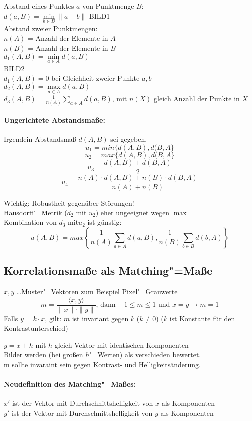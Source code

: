 \documentclass[a4paper,12pt]{scrreprt}
\begin{document}
Abstand eines Punktes $a$ von Punktmenge $B$:\\ $d(a,B)=\min\limits_{b\in B}
\|a-b\|$
BILD1\\
Abstand zweier Punktmengen:\\
$n(A)$ = Anzahl der Elemente in $A$\\
$n(B)$ = Anzahl der Elemente in $B$\\
$d_1(A,B)=\min\limits_{a\in A} d(a,B)$\\
BILD2\\
$d_1(A,B)=0$ bei Gleichheit zweier Punkte $a,b$\\
$d_2(A,B)=\max\limits_{a\in A} d(a,B)$\\
$d_3(A,B)=\frac{1}{n(A)}\sum\limits_{a\in A} d(a,B)$, mit $n(X)$ gleich
Anzahl der Punkte in $X$\\

\paragraph{Ungerichtete Abstandsmaße:}
Irgendein Abstandsmaß $d(A,B)$ sei gegeben. \\
$$u_1=min\{d(A,B), d(B,A\}$$
$$u_2=max\{d(A,B), d(B,A\}$$
$$u_3=\frac{d(A,B)+d(B,A)}{2}$$
$$u_4=\frac{n(A)\cdot d(A,B)+n(B)\cdot d(B,A)}{n(A)+n(B)}$$

Wichtig: Robustheit gegenüber Störungen!\\
Hausdorff"=Metrik ($d_2$ mit $u_2$) eher ungeeignet wegen $\max$\\
Kombination von $d_3$ mit$u_2$ ist günstig: $$ u(A,B)=max\left\{
	\frac{1}{n(A)}\sum\limits_{a\in A} d(a,B),
	\frac{1}{n(B)}\sum\limits_{b\in B}d(b,A)\right\}$$
\subsection{Korrelationsmaße als Matching"=Maße}
$x,y$ \ldots Muster"=Vektoren zum Beispiel Pixel"=Grauwerte
$$m=\frac{\langle x,y\rangle}{\|x\|\cdot\|y\|}\text{, dann} -1\le m \le1 \text{ und } x=y\to m=1$$
Falls $y=k\cdot x$, gilt: $m$ ist invariant gegen $k$ ($k\not=0$)
($k$ ist Konstante für den Kontrastunterschied)

$y=x+h$ mit $h$ gleich Vektor mit identischen Komponenten\\
Bilder werden (bei großen $h$"=Werten) als verschieden
bewertet.\\
m sollte invaraint sein gegen Kontrast- und Helligkeitsänderung.\\

\paragraph{Neudefinition des Matching"=Maßes:}%
$ x' $ ist der Vektor mit Durchschnittshelligkeit von $x$ als Komponenten\\
$y'$ ist der Vektor mit Durchschnittshelligkeit von $y$ als
Komponenten
\end{document}
